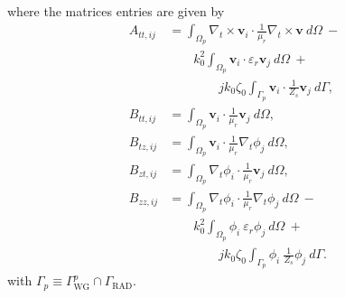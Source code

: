 \documentclass[journal,twoside,letterpaper]{IEEEtran}
\renewcommand{\vec}[1]{\mathbf{#1}}
\begin{document}
%
\noindent where the matrices entries are given by
\begin{equation*}
\begin{aligned}
A_{tt,ij} &= \int_{\Omega_p} \nabla_t \times \vec{v}_i  \cdot \frac{1}{\mu_r} \nabla_t \times \vec{v} \ d\Omega \ - \\
 & \qquad k_0^2 \int_{\Omega_p} \vec{v}_i  \cdot \varepsilon_r \vec{v}_j \ d\Omega \ + \\ 
&  \qquad \qquad j k_0 \zeta_0
\int_{\Gamma_p} \vec{v}_i  \cdot \frac{1}{Z_s} \vec{v}_j \ d\Gamma, \\
B_{tt,ij} &=  \int_{\Omega_p} \vec{v}_i  \cdot  \frac{1}{\mu_r}\vec{v}_j \ d\Omega, \\
B_{tz,ij} &=  \int_{\Omega_p} \vec{v}_i  \cdot  \frac{1}{\mu_r}\nabla_t \phi_j \ d\Omega, \\
B_{zt,ij} &=  \int_{\Omega_p} \nabla_t \phi_i  \cdot  \frac{1}{\mu_r}\vec{v}_j \ d\Omega, \\
B_{zz,ij} &=  \int_{\Omega_p} \nabla_t \phi_i  \cdot  \frac{1}{\mu_r}\nabla_t \phi_j \ d\Omega \ - \\
& \qquad k_0^2  \int_{\Omega_p} \phi_i \ \varepsilon_r \phi_j \ d\Omega \ +\\
& \qquad \qquad j k_0 \zeta_0 \int_{\Gamma_p} \phi_i \ \frac{1}{Z_s} \phi_j \ d\Gamma.
\end{aligned}
\end{equation*}
\noindent with $\Gamma_p \equiv {\Gamma_\text{WG}^{p} \cap \Gamma_{\text{RAD}}}$.
%
\end{document}
